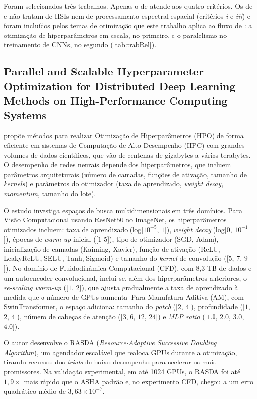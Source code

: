 Foram selecionados três trabalhos. Apenas o de  atende aos quatro critérios. Os de  e  não tratam de HSIs nem de processamento espectral-espacial (critérios \textit{i} e \textit{iii}) e foram incluídos pelos temas de otimização que este trabalho aplica ao fluxo de : a otimização de hiperparâmetros em escala, no primeiro, e o paralelismo no treinamento de CNNs, no segundo (\autoref{tab:trabRel}).

\subsection{Parallel and Scalable Hyperparameter Optimization for Distributed Deep Learning Methods on High-Performance Computing Systems}

 propõe métodos para realizar Otimização de Hiperparâmetros (HPO) de forma eficiente em sistemas de Computação de Alto Desempenho (HPC) com grandes volumes de dados científicos, que vão de centenas de gigabytes a vários terabytes. O desempenho de redes neurais depende dos hiperparâmetros, que incluem parâmetros arquiteturais (número de camadas, funções de ativação, tamanho de \textit{kernels}) e parâmetros do otimizador (taxa de aprendizado, \textit{weight decay}, \textit{momentum}, tamanho do lote).

O estudo investiga espaços de busca multidimensionais em três domínios. Para Visão Computacional usando ResNet50 no ImageNet, os hiperparâmetros otimizados incluem: taxa de aprendizado (log[$10^{-5}$, $1$]), \textit{weight decay} (log[$0$, $10^{-1}$]), épocas de \textit{warm-up} inicial ([$1$-$5$]), tipo de otimizador (SGD, Adam), inicialização de camadas (Kaiming, Xavier), função de ativação (ReLU, LeakyReLU, SELU, Tanh, Sigmoid) e tamanho do \textit{kernel} de convolução ([$5$, $7$, $9$]). No domínio de Fluidodinâmica Computacional (CFD), com 8,3 TB de dados e um autoencoder convolucional, inclui-se, além dos hiperparâmetros anteriores, o \textit{re-scaling warm-up} ([$1$, $2$]), que ajusta gradualmente a taxa de aprendizado à medida que o número de GPUs aumenta. Para Manufatura Aditiva (AM), com SwinTransformer, o espaço adiciona: tamanho do \textit{patch} ([$2$, $4$]), profundidade ([$1$, $2$, $4$]), número de cabeças de atenção ([$3$, $6$, $12$, $24$]) e \textit{MLP ratio} ([$1.0$, $2.0$, $3.0$, $4.0$]).

O autor desenvolve o RASDA (\textit{Resource-Adaptive Successive Doubling Algorithm}), um agendador escalável que realoca GPUs durante a otimização, tirando recursos dos \textit{trials} de baixo desempenho para acelerar os mais promissores. Na validação experimental, em até 1024 GPUs, o RASDA foi até $1,9\times$ mais rápido que o ASHA padrão e, no experimento CFD, chegou a um erro quadrático médio de $3,63 \times 10^{-7}$.

